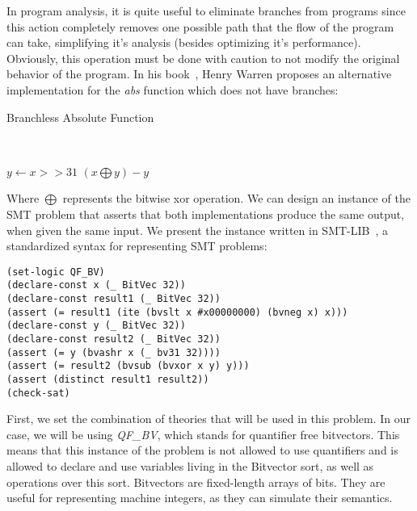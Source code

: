 In program analysis, it is quite useful to eliminate branches from programs since this action completely removes one possible path that the flow of the program can take, simplifying it's analysis (besides optimizing it's performance). Obviously, this operation must be done with caution to not modify the original behavior of the program. In his book~\cite{hacker_delight}, Henry Warren proposes an alternative implementation for the \textit{abs} function which does not have branches:

\begin{algorithm}[H]
\caption{Branchless Absolute Function}~\label{branchlessAbs}
\begin{algorithmic}[1]
  \State $y \gets x >> 31$
  \State \Return $(x \bigoplus y) - y$
\EndFunction
\end{algorithmic}
\end{algorithm}

Where $\bigoplus$ represents the bitwise xor operation. We can design an instance of the SMT problem that asserts that both implementations produce the same output, when given the same input. We present the instance written in SMT-LIB~\cite{smtlib}, a standardized syntax for representing SMT problems:

\begin{verbatim}
(set-logic QF_BV)
(declare-const x (_ BitVec 32))
(declare-const result1 (_ BitVec 32))
(assert (= result1 (ite (bvslt x #x00000000) (bvneg x) x)))
(declare-const y (_ BitVec 32))
(declare-const result2 (_ BitVec 32))
(assert (= y (bvashr x (_ bv31 32))))
(assert (= result2 (bvsub (bvxor x y) y)))
(assert (distinct result1 result2))
(check-sat)
\end{verbatim}

First, we set the combination of theories that will be used in this problem. In our case, we will be using \textit{QF\_BV}, which stands for quantifier free bitvectors. This means that this instance of the problem is not allowed to use quantifiers and is allowed to declare and use variables living in the Bitvector sort, as well as operations over this sort. Bitvectors are fixed-length arrays of bits. They are useful for representing machine integers, as they can simulate their semantics.

